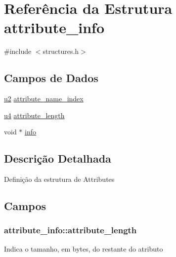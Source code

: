 \hypertarget{structattribute__info}{}\section{Referência da Estrutura attribute\+\_\+info}
\label{structattribute__info}


{\ttfamily \#include $<$structures.\+h$>$}

\subsection*{Campos de Dados}
\begin{DoxyCompactItemize}
\item 
\hyperlink{lista__operandos_8h_a732cde1300aafb73b0ea6c2558a7a54f}{u2} \hyperlink{structattribute__info_a19df9d4b42eb55ca5dc1bed98df89378}{attribute\+\_\+name\+\_\+index}
\item 
\hyperlink{lista__operandos_8h_ae5be1f726785414dd1b77d60df074c9d}{u4} \hyperlink{structattribute__info_a1ed8f679458c4bb0ed3315721588f50d}{attribute\+\_\+length}
\item 
void $\ast$ \hyperlink{structattribute__info_a7f168925308e418b7b44c9f11fdf42ae}{info}
\end{DoxyCompactItemize}


\subsection{Descrição Detalhada}
Definição da estrutura de Attributes 

\subsection{Campos}
\subsubsection[{\texorpdfstring{attribute\+\_\+length}{attribute_length}}]{ attribute\+\_\+info\+::attribute\+\_\+length}\hypertarget{structattribute__info_a1ed8f679458c4bb0ed3315721588f50d}{}\label{structattribute__info_a1ed8f679458c4bb0ed3315721588f50d}
Indica o tamanho, em bytes, do restante do atributo 
